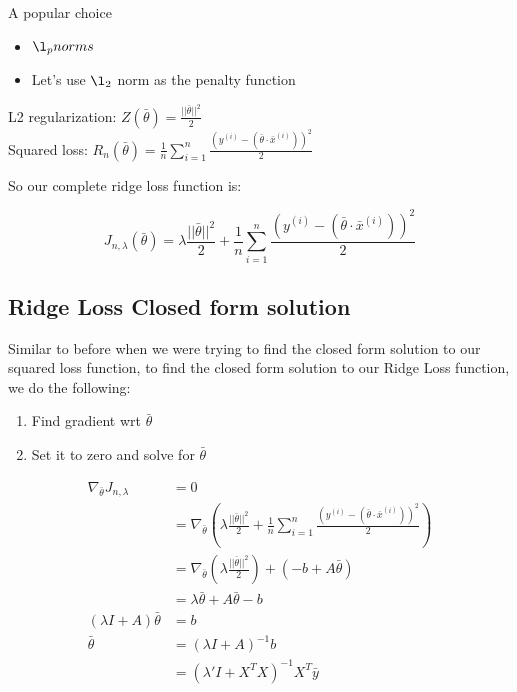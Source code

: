 \documentclass[12pt]{article}
\begin{document}
A popular choice
\begin{itemize}
	\item $\l_p norms$
	\item Let's use $\l_2$ norm as the penalty function
\end{itemize}

L2 regularization: $Z(\bar{\theta}) = \frac {||\bar{\theta}||^2} 2$\\
Squared loss: $R_n(\bar{\theta}) = \frac 1 n \sum_{i=1}^n \frac {(y^{(i)} - (\bar{\theta} \cdot \bar{x}^{(i)}))^2} 2$

So our complete ridge loss function is:

\[ J_{n,\lambda} (\bar{\theta}) = \lambda \frac {||\bar{\theta}||^2} 2 + \frac 1 n \sum_{i=1}^n \frac {(y^{(i)} - (\bar{\theta} \cdot \bar{x}^{(i)}))^2} 2 \]

\subsection{Ridge Loss Closed form solution}

Similar to before when we were trying to find the closed form solution to our squared loss function, to find the closed form solution to our Ridge Loss function, we do the following:

\begin{enumerate}
	\item Find gradient wrt $\bar{\theta}$
	\item Set it to zero and solve for $\bar{\theta}$
\end{enumerate}

\[
	\begin{aligned}
		\nabla_{\bar{\theta}} J_{n, \lambda} &= 0\\
																				 &= \nabla_{\bar{\theta}} \left(\lambda \frac {||\bar{\theta}||^2} 2 + \frac 1 n \sum_{i=1}^n \frac {(y^{(i)} - (\bar{\theta} \cdot \bar{x}^{(i)}))^2} 2\right)\\
																				 &= \nabla_{\bar{\theta}} \left(\lambda \frac {||\bar{\theta}||^2} 2\right) + (-b + A \bar{\theta})\\
																				 &= \lambda \bar{\theta} + A\bar{\theta} - b\\
		(\lambda I + A)\bar{\theta} &= b\\
		\bar{\theta} &= (\lambda I + A)^{-1}b\\
								 &= (\lambda' I + X^TX)^{-1}X^T \bar y
	\end{aligned}
\]
\end{document}

